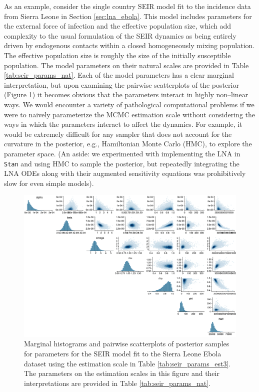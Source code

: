 As an example, consider the single country SEIR model fit to the incidence data from Sierra Leone in Section \ref{sec:lna_ebola}. This model includes parameters for the external force of infection and the effective population size, which add complexity to the usual formulation of the SEIR dynamics as being entirely driven by endogenous contacts within a closed homogeneously mixing population. The effective population size is roughly the size of the initially susceptible population. The model parameters on their natural scales are provided in Table \ref{tab:seir_params_nat}. Each of the model parameters has a clear marginal interpretation, but upon examining the pairwise scatterplots of the posterior (Figure \ref{fig:slpairs1}) it becomes obvious that the parameters interact in highly non--linear ways. We would encounter a variety of pathological computational problems if we were to naively parameterize the MCMC estimation scale without considering the ways in which the parameters interact to affect the dynamics. For example, it would be extremely difficult for any sampler that does not account for the curvature in the posterior, e.g., Hamiltonian Monte Carlo (HMC), to explore the parameter space. (An aside: we experimented with implementing the LNA in \texttt{Stan} and using HMC to sample the posterior, but repeatedly integrating the LNA ODEs along with their augmented sensitivity equations was prohibitively slow for even simple models).  

\begin{figure}[htbp]
	\centering
	\includegraphics[width=\linewidth]{figures/sln_pairs_nat}
	\caption[Posterior scatterplots for Sierra Leone SEIR model parameters on their natural scales.]{Marginal histograms and pairwise scatterplots of posterior samples for parameters for the SEIR model fit to the Sierra Leone Ebola dataset using the estimation scale in Table \ref{tab:seir_params_est3}. The parameters on the estimation scales in this figure and their interpretations are provided in Table \ref{tab:seir_params_nat}.} 
	\label{fig:slpairs1}
\end{figure}

